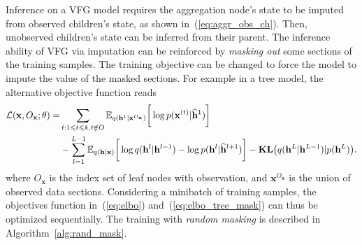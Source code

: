 \documentclass{article}
\begin{document}
Inference on a VFG model requires the aggregation node's state to be imputed from observed children's state, as shown in~(\ref{eq:aggr_obs_ch}).
Then, unobserved children's state can be inferred from their parent.  
The inference ability of VFG via imputation can be reinforced by \emph{masking out} some sections of the training samples. 
The training objective can be changed to force the model to impute the value of the masked sections. 
For example in a tree model, the alternative objective function reads
\begin{align}  \label{eq:elbo_tree_mask}
\mathcal{L}(\mathbf{x}, O_{\mathbf{x}}; \theta)
= & \sum_{t: 1\leqslant t \leqslant k, t\notin O}
 \mathbb{E}_{q(\mathbf{h}^{1}|\mathbf{x}^{O_{\mathbf{x}}} )} \bigg[ \log p( \mathbf{x}^{(t)}|  \widehat{\mathbf{h}}^{1})   \bigg] \\ \notag
 &- \sum_{l=1}^{L-1}  \mathbb{E}_{q(\mathbf{h}|\mathbf{x})} \bigg[ \log q(\mathbf{h}^{l}|\mathbf{h}^{l-1}) - \log p( \mathbf{h}^{l}|  \widehat{\mathbf{h}}^{l+1})   \bigg]    
 -  \textbf{\text{KL}}\big(q(\mathbf{h}^L | \mathbf{h}^{L-1} )   | p(\mathbf{h}^L)  \big).
\end{align} %
where $O_{\mathbf{x}}$ is the index set of leaf nodes  with observation, and $\mathbf{x}^{O_{\mathbf{x}}}$ is the union of observed data sections. 
Considering a minibatch of training samples, the objectives function in~(\ref{eq:elbo})
and~(\ref{eq:elbo_tree_mask}) can thus be optimized sequentially. 
The training with \emph{random masking} is described in Algorithm~\ref{alg:rand_mask}. 
\end{document}
